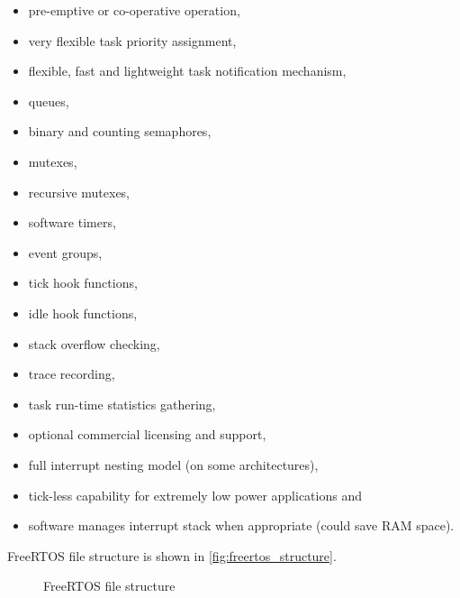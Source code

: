 \begin{itemize}
    
    \item pre-emptive or co-operative operation,
    \item very flexible task priority assignment,
    \item flexible, fast and lightweight task notification mechanism,
    \item queues,
    \item binary and counting semaphores,
    \item mutexes,
    \item recursive mutexes,
    \item software timers,
    \item event groups,
    \item tick hook functions,
    \item idle hook functions,
    \item stack overflow checking,
    \item trace recording,
    \item task run-time statistics gathering,
    \item optional commercial licensing and support,
    \item full interrupt nesting model (on some architectures),
    \item tick-less capability for extremely low power applications and
    \item software manages interrupt stack when appropriate (could save RAM space).
    
\end{itemize}

\noindent FreeRTOS file structure is shown in \autoref{fig:freertos_structure}.

\begin{figure}[H]
\caption{FreeRTOS file structure}
\label{fig:freertos_structure}
\end{figure}

